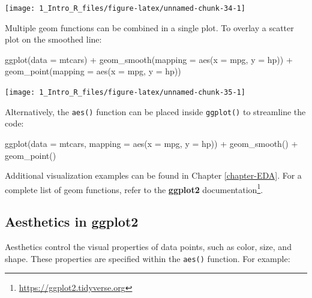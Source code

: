 \documentclass[
  11pt,
]{book}
\makeatletter
\newenvironment{Shaded}{}{}
\newcommand{\AttributeTok}[1]{#1}
\newcommand{\FunctionTok}[1]{#1}
\newcommand{\NormalTok}[1]{#1}
\newcommand{\SpecialCharTok}[1]{\textcolor[rgb]{0.39,0.39,0.39}{#1}}
\renewcommand{\href}[2]{#2\footnote{\url{#1}}}
\newenvironment{kframe}{%
\medskip{}
\setlength{\fboxsep}{.8em}
 \def\at@end@of@kframe{}%
 \ifinner\ifhmode%
  \def\at@end@of@kframe{\end{minipage}}%
  \begin{minipage}{\columnwidth}%
 \fi\fi%
 \def\FrameCommand##1{\hskip\@totalleftmargin \hskip-\fboxsep
 \colorbox{shadecolor}{##1}\hskip-\fboxsep
     \hskip-\linewidth \hskip-\@totalleftmargin \hskip\columnwidth}%
 \MakeFramed {\advance\hsize-\width
   \@totalleftmargin\z@ \linewidth\hsize
   \@setminipage}}%
 {\par\unskip\endMakeFramed%
 \at@end@of@kframe}
\renewenvironment{Shaded}{\begin{kframe}}{\end{kframe}}
\theoremstyle{definition}
\theoremstyle{definition}
\theoremstyle{definition}
\theoremstyle{definition}
\theoremstyle{remark}
\makeatother
\begin{document}
\begin{center}\texttt{[image: 1\_Intro\_R\_files/figure-latex/unnamed-chunk-34-1]} \end{center}

Multiple geom functions can be combined in a single plot. To overlay a scatter plot on the smoothed line:

\begin{Shaded}
\begin{Highlighting}[]
\FunctionTok{ggplot}\NormalTok{(}\AttributeTok{data =}\NormalTok{ mtcars) }\SpecialCharTok{+}
  \FunctionTok{geom\_smooth}\NormalTok{(}\AttributeTok{mapping =} \FunctionTok{aes}\NormalTok{(}\AttributeTok{x =}\NormalTok{ mpg, }\AttributeTok{y =}\NormalTok{ hp)) }\SpecialCharTok{+} 
  \FunctionTok{geom\_point}\NormalTok{(}\AttributeTok{mapping =} \FunctionTok{aes}\NormalTok{(}\AttributeTok{x =}\NormalTok{ mpg, }\AttributeTok{y =}\NormalTok{ hp))}
\end{Highlighting}
\end{Shaded}

\begin{center}\texttt{[image: 1\_Intro\_R\_files/figure-latex/unnamed-chunk-35-1]} \end{center}

Alternatively, the \texttt{aes()} function can be placed inside \texttt{ggplot()} to streamline the code:

\begin{Shaded}
\begin{Highlighting}[]
\FunctionTok{ggplot}\NormalTok{(}\AttributeTok{data =}\NormalTok{ mtcars, }\AttributeTok{mapping =} \FunctionTok{aes}\NormalTok{(}\AttributeTok{x =}\NormalTok{ mpg, }\AttributeTok{y =}\NormalTok{ hp)) }\SpecialCharTok{+}
  \FunctionTok{geom\_smooth}\NormalTok{() }\SpecialCharTok{+} 
  \FunctionTok{geom\_point}\NormalTok{()}
\end{Highlighting}
\end{Shaded}

Additional visualization examples can be found in Chapter \ref{chapter-EDA}. For a complete list of geom functions, refer to the \href{https://ggplot2.tidyverse.org}{\textbf{ggplot2} documentation}.

\subsection*{Aesthetics in ggplot2}\label{aesthetics-in-ggplot2}


Aesthetics control the visual properties of data points, such as color, size, and shape. These properties are specified within the \texttt{aes()} function. For example:
\end{document}
